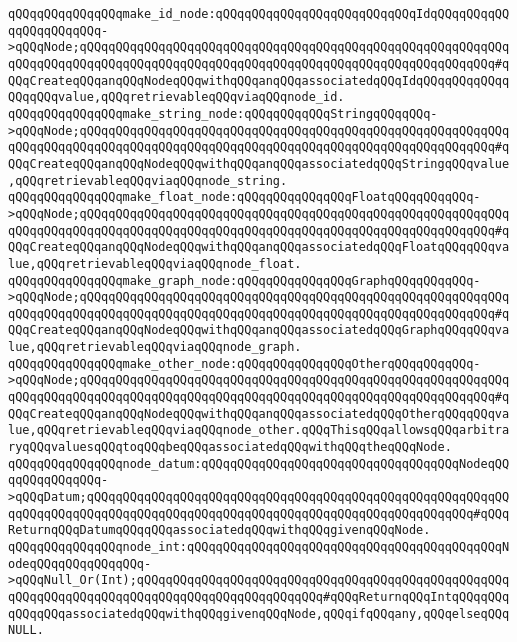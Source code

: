 \verb|qQQqqQQqqQQqqQQqmake_id_node:qQQqqQQqqQQqqQQqqQQqqQQqqQQqIdqQQqqQQqqQQqqQQqqQQqqQQq->qQQqNode;qQQqqQQqqQQqqQQqqQQqqQQqqQQqqQQqqQQqqQQqqQQqqQQqqQQqqQQqqQQqqQQqqQQqqQQqqQQqqQQqqQQqqQQqqQQqqQQqqQQqqQQqqQQqqQQqqQQqqQQqqQQqqQQq#qQQqCreateqQQqanqQQqNodeqQQqwithqQQqanqQQqassociatedqQQqIdqQQqqQQqqQQqqQQqqQQqvalue,qQQqretrievableqQQqviaqQQqnode_id.|\newline
\verb|qQQqqQQqqQQqqQQqmake_string_node:qQQqqQQqqQQqStringqQQqqQQq->qQQqNode;qQQqqQQqqQQqqQQqqQQqqQQqqQQqqQQqqQQqqQQqqQQqqQQqqQQqqQQqqQQqqQQqqQQqqQQqqQQqqQQqqQQqqQQqqQQqqQQqqQQqqQQqqQQqqQQqqQQqqQQqqQQqqQQq#qQQqCreateqQQqanqQQqNodeqQQqwithqQQqanqQQqassociatedqQQqStringqQQqvalue,qQQqretrievableqQQqviaqQQqnode_string.|\newline
\verb|qQQqqQQqqQQqqQQqmake_float_node:qQQqqQQqqQQqqQQqFloatqQQqqQQqqQQq->qQQqNode;qQQqqQQqqQQqqQQqqQQqqQQqqQQqqQQqqQQqqQQqqQQqqQQqqQQqqQQqqQQqqQQqqQQqqQQqqQQqqQQqqQQqqQQqqQQqqQQqqQQqqQQqqQQqqQQqqQQqqQQqqQQqqQQq#qQQqCreateqQQqanqQQqNodeqQQqwithqQQqanqQQqassociatedqQQqFloatqQQqqQQqvalue,qQQqretrievableqQQqviaqQQqnode_float.|\newline
\verb|qQQqqQQqqQQqqQQqmake_graph_node:qQQqqQQqqQQqqQQqGraphqQQqqQQqqQQq->qQQqNode;qQQqqQQqqQQqqQQqqQQqqQQqqQQqqQQqqQQqqQQqqQQqqQQqqQQqqQQqqQQqqQQqqQQqqQQqqQQqqQQqqQQqqQQqqQQqqQQqqQQqqQQqqQQqqQQqqQQqqQQqqQQqqQQq#qQQqCreateqQQqanqQQqNodeqQQqwithqQQqanqQQqassociatedqQQqGraphqQQqqQQqvalue,qQQqretrievableqQQqviaqQQqnode_graph.|\newline
\verb|qQQqqQQqqQQqqQQqmake_other_node:qQQqqQQqqQQqqQQqOtherqQQqqQQqqQQq->qQQqNode;qQQqqQQqqQQqqQQqqQQqqQQqqQQqqQQqqQQqqQQqqQQqqQQqqQQqqQQqqQQqqQQqqQQqqQQqqQQqqQQqqQQqqQQqqQQqqQQqqQQqqQQqqQQqqQQqqQQqqQQqqQQqqQQq#qQQqCreateqQQqanqQQqNodeqQQqwithqQQqanqQQqassociatedqQQqOtherqQQqqQQqvalue,qQQqretrievableqQQqviaqQQqnode_other.qQQqThisqQQqallowsqQQqarbitraryqQQqvaluesqQQqtoqQQqbeqQQqassociatedqQQqwithqQQqtheqQQqNode.|\newline
\newline
\verb|qQQqqQQqqQQqqQQqnode_datum:qQQqqQQqqQQqqQQqqQQqqQQqqQQqqQQqqQQqNodeqQQqqQQqqQQqqQQq->qQQqDatum;qQQqqQQqqQQqqQQqqQQqqQQqqQQqqQQqqQQqqQQqqQQqqQQqqQQqqQQqqQQqqQQqqQQqqQQqqQQqqQQqqQQqqQQqqQQqqQQqqQQqqQQqqQQqqQQqqQQqqQQqqQQq#qQQqReturnqQQqDatumqQQqqQQqassociatedqQQqwithqQQqgivenqQQqNode.|\newline
\verb|qQQqqQQqqQQqqQQqnode_int:qQQqqQQqqQQqqQQqqQQqqQQqqQQqqQQqqQQqqQQqqQQqNodeqQQqqQQqqQQqqQQq->qQQqNull_Or(Int);qQQqqQQqqQQqqQQqqQQqqQQqqQQqqQQqqQQqqQQqqQQqqQQqqQQqqQQqqQQqqQQqqQQqqQQqqQQqqQQqqQQqqQQqqQQqqQQq#qQQqReturnqQQqIntqQQqqQQqqQQqqQQqassociatedqQQqwithqQQqgivenqQQqNode,qQQqifqQQqany,qQQqelseqQQqNULL.|\newline
